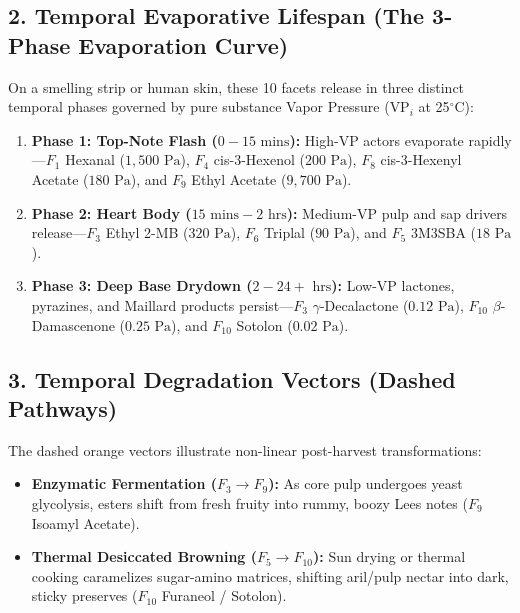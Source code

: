 \documentclass[11pt,a4paper]{article}
\begin{document}
\subsection{2. Temporal Evaporative Lifespan (The 3-Phase Evaporation Curve)}
On a smelling strip or human skin, these 10 facets release in three distinct temporal phases governed by pure substance Vapor Pressure ($\text{VP}_i$ at 25$^\circ$C):
\begin{enumerate}[leftmargin=1.5em]
    \item \textbf{Phase 1: Top-Note Flash ($0 - 15 \text{ mins}$):} High-VP actors evaporate rapidly---$F_1$ Hexanal ($1,500\text{ Pa}$), $F_4$ cis-3-Hexenol ($200\text{ Pa}$), $F_8$ cis-3-Hexenyl Acetate ($180\text{ Pa}$), and $F_9$ Ethyl Acetate ($9,700\text{ Pa}$).
    \item \textbf{Phase 2: Heart Body ($15 \text{ mins} - 2 \text{ hrs}$):} Medium-VP pulp and sap drivers release---$F_3$ Ethyl 2-MB ($320\text{ Pa}$), $F_6$ Triplal ($90\text{ Pa}$), and $F_5$ 3M3SBA ($18\text{ Pa}$).
    \item \textbf{Phase 3: Deep Base Drydown ($2 - 24+ \text{ hrs}$):} Low-VP lactones, pyrazines, and Maillard products persist---$F_3$ $\gamma$-Decalactone ($0.12\text{ Pa}$), $F_{10}$ $\beta$-Damascenone ($0.25\text{ Pa}$), and $F_{10}$ Sotolon ($0.02\text{ Pa}$).
\end{enumerate}

\subsection{3. Temporal Degradation Vectors (Dashed Pathways)}
The dashed orange vectors illustrate non-linear post-harvest transformations:
\begin{itemize}[leftmargin=1.5em]
    \item \textbf{Enzymatic Fermentation ($F_3 \rightarrow F_9$):} As core pulp undergoes yeast glycolysis, esters shift from fresh fruity into rummy, boozy Lees notes ($F_9$ Isoamyl Acetate).
    \item \textbf{Thermal Desiccated Browning ($F_5 \rightarrow F_{10}$):} Sun drying or thermal cooking caramelizes sugar-amino matrices, shifting aril/pulp nectar into dark, sticky preserves ($F_{10}$ Furaneol / Sotolon).
\end{itemize}
\end{document}
